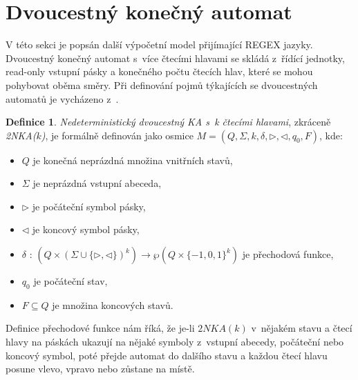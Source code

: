 \documentclass[thesis=B,czech]{FITthesis}[2019/12/23]
\theoremstyle{definition}
\newtheorem{definition}{Definice}[chapter]
\begin{document}
\section{Dvoucestný konečný automat}\label{sec:twoway}
V této sekci je popsán další výpočetní model přijímající REGEX jazyky. Dvoucestný konečný automat s~více čtecími hlavami se skládá z~řídící jednotky, read-only vstupní pásky a konečného počtu čtecích hlav, které se mohou pohybovat oběma směry. 
Při definování pojmů týkajících se dvoucestných automatů je vycházeno z~\cite{holzer}.
\begin{definition}
\emph{Nedeterministický dvoucestný KA s~k čtecími hlavami}, zkráceně \emph{2NKA($k$)}, je formálně definován jako osmice $M = \left(Q, \Sigma, k, \delta, \triangleright, \triangleleft, q_0, F\right)$, kde:
\begin{itemize}
	\item{$Q$ je konečná neprázdná množina vnitřních stavů,}
	\item{$\Sigma$ je neprázdná vstupní abeceda,}
	\item{$\triangleright$ je počáteční symbol pásky,}
	\item{$\triangleleft$ je koncový symbol pásky,}
	\item{$\delta$ : $\left(Q \times (\Sigma \cup \{\triangleright, \triangleleft \})^k\right) \rightarrow \wp\left( Q\times \{-1, 0, 1\}^k \right)$ je přechodová funkce,}
	\item{$q_0$ je počáteční stav,}
	\item{$F \subseteq Q$ je množina koncových stavů.}
\end{itemize}
\end{definition}

Definice přechodové funkce nám říká, že je-li $2NKA(k)$ v~nějakém stavu a čtecí hlavy na páskách ukazují na nějaké symboly z~vstupní abecedy, počáteční nebo koncový symbol, poté přejde automat do dalšího stavu a každou čtecí hlavu posune vlevo, vpravo nebo zůstane na místě.
\end{document}
